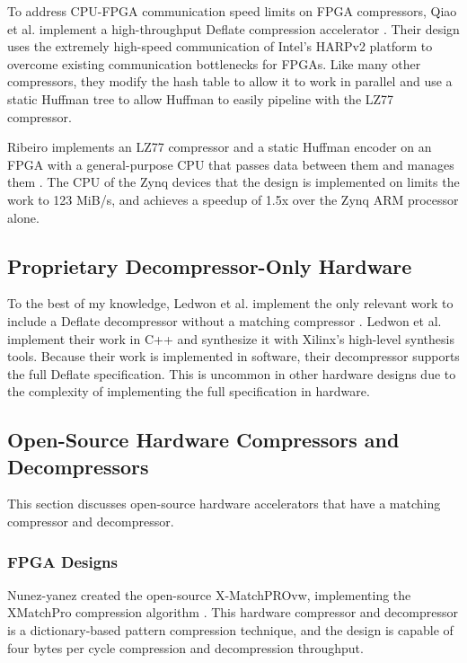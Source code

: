 \documentclass[doublespace,nopageskip]{VTthesis}
\begin{document}
To address CPU-FPGA communication speed limits on FPGA compressors, Qiao et al. implement a high-throughput Deflate compression accelerator \cite{fpgadeflate}. Their design uses the extremely high-speed communication of Intel's HARPv2 platform to overcome existing communication bottlenecks for FPGAs. Like many other compressors, they modify the hash table to allow it to work in parallel and use a static Huffman tree to allow Huffman to easily pipeline with the LZ77 compressor.

Ribeiro implements an LZ77 compressor and a static Huffman encoder on an FPGA with a general-purpose CPU that passes data between them and manages them \cite{ribeiro}. The CPU of the Zynq devices that the design is implemented on limits the work to 123 MiB/s, and achieves a speedup of 1.5x over the Zynq ARM processor alone.

\subsection{Proprietary Decompressor-Only Hardware}\label{ss:proprietary_decompressor-only_hardware}
To the best of my knowledge, Ledwon et al. implement the only relevant work to include a Deflate decompressor without a matching compressor \cite{deflatedecompression}. Ledwon et al. implement their work in C++ and synthesize it with Xilinx's high-level synthesis tools. Because their work is implemented in software, their decompressor supports the full Deflate specification. This is uncommon in other hardware designs due to the complexity of implementing the full specification in hardware.

\subsection{Open-Source Hardware Compressors and Decompressors}\label{ss:open-source_hardware_compressors_and_decompressors}
This section discusses open-source hardware accelerators that have a matching compressor and decompressor.

\subsubsection{FPGA Designs}\label{sss:open_fpga_designs}
Nunez-yanez created the open-source X-MatchPROvw, implementing the XMatchPro compression algorithm \cite{xmatchpro}. This hardware compressor and decompressor is a dictionary-based pattern compression technique, and the design is capable of four bytes per cycle compression and decompression throughput.
\end{document}
